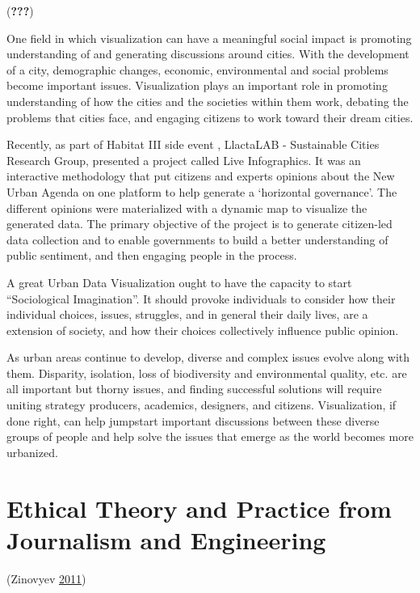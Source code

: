 \documentclass[]{book}
\begin{document}
({\textbf{???}})

One field in which visualization can have a meaningful social impact is promoting understanding of and generating discussions around cities. With the development of a city, demographic changes, economic, environmental and social problems become important issues. Visualization plays an important role in promoting understanding of how the cities and the societies within them work, debating the problems that cities face, and engaging citizens to work toward their dream cities.

Recently, as part of Habitat III side event , LlactaLAB - Sustainable Cities Research Group, presented a project called Live Infographics. It was an interactive methodology that put citizens and experts opinions about the New Urban Agenda on one platform to help generate a `horizontal governance'. The different opinions were materialized with a dynamic map to visualize the generated data. The primary objective of the project is to generate citizen-led data collection and to enable governments to build a better understanding of public sentiment, and then engaging people in the process.

A great Urban Data Visualization ought to have the capacity to start ``Sociological Imagination''. It should provoke individuals to consider how their individual choices, issues, struggles, and in general their daily lives, are a extension of society, and how their choices collectively influence public opinion.

As urban areas continue to develop, diverse and complex issues evolve along with them. Disparity, isolation, loss of biodiversity and environmental quality, etc. are all important but thorny issues, and finding successful solutions will require uniting strategy producers, academics, designers, and citizens. Visualization, if done right, can help jumpstart important discussions between these diverse groups of people and help solve the issues that emerge as the world becomes more urbanized.

\hypertarget{ethical-theory-and-practice-from-journalism-and-engineering}{%
\section{Ethical Theory and Practice from Journalism and Engineering}\label{ethical-theory-and-practice-from-journalism-and-engineering}}

(Zinovyev \protect\hyperlink{ref-poli_social_science}{2011})
\end{document}
